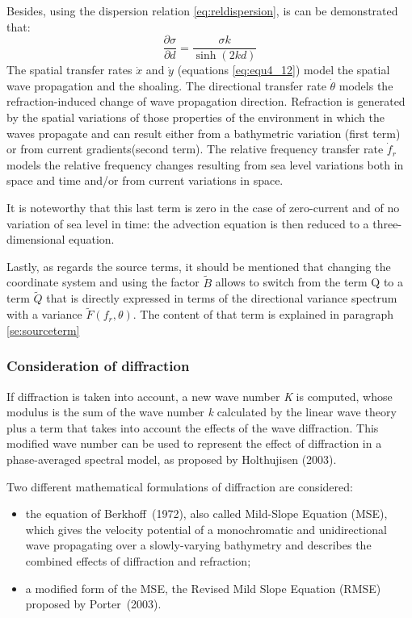  Besides, using the dispersion relation \ref{eq:reldispersion}, is can be demonstrated that:
\begin{equation} \label{GrindEQ__4_14_}
\frac{\partial \sigma }{\partial d} =\frac{\sigma k}{\sinh (2kd)}
\end{equation}
The spatial transfer rates $\dot{x}$ and $\dot{y}$ (equations \ref{eq:equ4_12}) model the spatial wave propagation and the shoaling. The directional transfer rate $\dot{\theta }$ models the refraction-induced change of wave propagation direction. Refraction is generated by the spatial variations of those properties of the environment in which the waves propagate and can result either from a bathymetric variation (first term) or from current gradients(second term). The relative frequency transfer rate $\dot{f}_{r} $ models the relative frequency changes resulting from sea level variations both in space and time and/or from current variations in space.

 It is noteworthy that this last term is zero in the case of zero-current and of no variation of sea level in time: the advection equation is then reduced to a three-dimensional equation.

 Lastly, as regards the source terms, it should be mentioned that changing the coordinate system and using the factor $\tilde{B}$ allows to switch from the term Q to a term $\tilde{Q}$ that is directly expressed in terms of the directional variance spectrum with a variance $\tilde{F}(f_r, \theta)$. The content of that term is explained in paragraph \ref{se:sourceterm}


\subsubsection{ Consideration of diffraction}

 If diffraction is taken into account, a new wave number \textit{K} is computed, whose modulus is the sum of the wave number \textit{k} calculated by the linear wave theory plus a term that takes into account the effects of the wave diffraction. This modified wave number can be used to represent the effect of diffraction in a phase-averaged spectral model, as proposed by Holthujisen (2003).

 Two different mathematical formulations of diffraction are considered:

\begin{itemize}
\item  the equation of Berkhoff~(1972), also called Mild-Slope Equation (MSE), which gives the velocity potential of a monochromatic and unidirectional wave propagating over a slowly-varying bathymetry and describes the combined effects of diffraction and refraction;

\item  a modified form of the MSE, the Revised Mild Slope Equation (RMSE) proposed by Porter~(2003).
\end{itemize}

